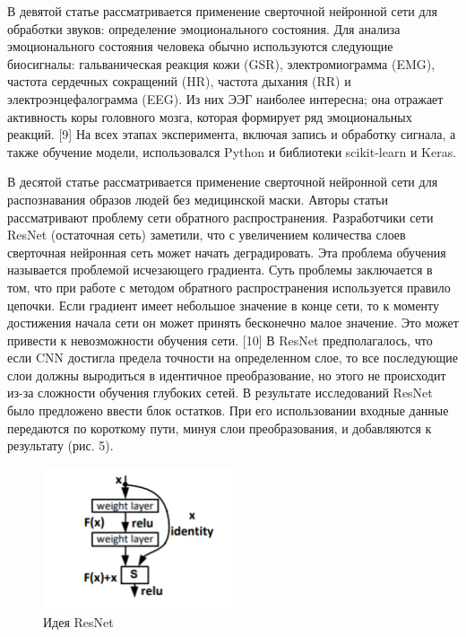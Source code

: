 \documentclass{svproc}
\begin{document}
В девятой статье рассматривается применение сверточной нейронной сети для обработки звуков: определение эмоционального состояния. Для анализа эмоционального состояния человека обычно используются следующие биосигналы: гальваническая реакция кожи (GSR), электромиограмма (EMG), частота сердечных сокращений (HR), частота дыхания (RR) и электроэнцефалограмма (EEG). Из них ЭЭГ наиболее интересна; она отражает активность коры головного мозга, которая формирует ряд эмоциональных реакций. [9] На всех этапах эксперимента, включая запись и обработку сигнала, а также обучение модели, использовался Python и библиотеки scikit-learn и Keras.

В десятой статье рассматривается применение сверточной нейронной сети для распознавания образов людей без медицинской маски. Авторы статьи рассматривают проблему сети обратного распространения. Разработчики сети ResNet (остаточная сеть) заметили, что с увеличением количества слоев сверточная нейронная сеть может начать деградировать. Эта проблема обучения называется проблемой исчезающего градиента. Суть проблемы заключается в том, что при работе с методом обратного распространения используется правило цепочки. Если градиент имеет небольшое значение в конце сети, то к моменту достижения начала сети он может принять бесконечно малое значение. Это может привести к невозможности обучения сети. [10] В ResNet предполагалось, что если CNN достигла предела точности на определенном слое, то все последующие слои должны выродиться в идентичное преобразование, но этого не происходит из-за сложности обучения глубоких сетей. В результате исследований ResNet было предложено ввести блок остатков. При его использовании входные данные передаются по короткому пути, минуя слои преобразования, и добавляются к результату (рис. 5).

\begin{figure}[h]
    \centering
    \includegraphics[width=0.50\textwidth]{picture_5}
    \caption{Идея ResNet}
    \label{fig:picture_5}
\end{figure}
\end{document}
